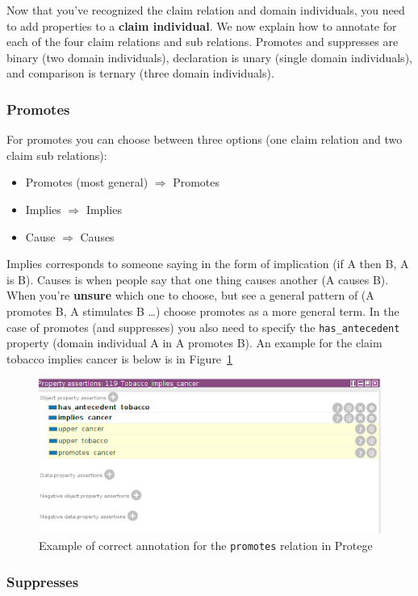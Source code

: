Now that you’ve recognized the claim relation and domain individuals, you need
to add properties to a \textbf{claim individual}. We now explain how to annotate for
each of the four claim relations and sub relations. Promotes and suppresses are
binary (two domain individuals), declaration is unary (single domain
individuals), and comparison is ternary (three domain individuals). 

\subsubsection*{Promotes}

For promotes you can choose between three options (one claim relation and two
claim sub relations):
\begin{itemize}
\item Promotes (most general) $\Rightarrow$ Promotes 
\item Implies $\Rightarrow$ Implies
\item Cause $\Rightarrow$ Causes
\end{itemize}
Implies corresponds to someone saying in the form of implication (if A then B,
A is B). Causes is when people say that one thing causes another (A causes B).
When you’re \textbf{unsure} which one to choose, but see a general pattern of (A
promotes B, A stimulates B \dots) choose promotes as a more general term.
In the case of promotes (and suppresses) you also need to specify the
\texttt{has\_antecedent} property (domain individual A in A promotes B). An example for
the claim tobacco implies cancer is below is in Figure~\ref{fig:promotes_example}

\begin{figure}
	\includegraphics{promotes.png}
	\caption{Example of correct annotation for the \texttt{promotes} relation in Protege}
\label{fig:promotes_example}
\end{figure}

\subsubsection*{Suppresses}

